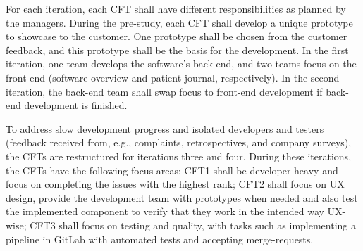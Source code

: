 For each iteration, each CFT shall have different responsibilities as planned by the managers. During the pre-study, each CFT shall develop a unique prototype to showcase to the customer. One prototype shall be chosen from the customer feedback, and this prototype shall be the basis for the development. In the first iteration, one team develops the software's back-end, and two teams focus on the front-end (software overview and patient journal, respectively). In the second iteration, the back-end team shall swap focus to front-end development if back-end development is finished. 

To address slow development progress and isolated developers and testers (feedback received from, e.g., complaints, retrospectives, and company surveys), the CFTs are restructured for iterations three and four. During these iterations, the CFTs have the following focus areas: CFT1 shall be developer-heavy and focus on completing the issues with the highest rank; CFT2 shall focus on UX design, provide the development team with prototypes when needed and also test the implemented component to verify that they work in the intended way UX-wise; CFT3 shall focus on testing and quality, with tasks such as implementing a pipeline in GitLab with automated tests and accepting merge-requests. 